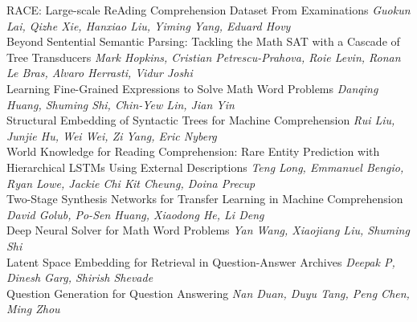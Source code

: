 \documentclass{book}
\begin{document}
    \noindent	RACE: Large-scale ReAding Comprehension Dataset From Examinations \newline 
    {\itshape Guokun Lai, Qizhe Xie, Hanxiao Liu, Yiming Yang, Eduard Hovy} \\
    
    \noindent	Beyond Sentential Semantic Parsing: Tackling the Math SAT with a Cascade of Tree Transducers \newline 
    {\itshape Mark Hopkins, Cristian Petrescu-Prahova, Roie Levin, Ronan Le Bras, Alvaro Herrasti, Vidur Joshi} \\
    
    \noindent	Learning Fine-Grained Expressions to Solve Math Word Problems \newline 
    {\itshape Danqing Huang, Shuming Shi, Chin-Yew Lin, Jian Yin} \\
    
    \noindent	Structural Embedding of Syntactic Trees for Machine Comprehension \newline 
    {\itshape Rui Liu, Junjie Hu, Wei Wei, Zi Yang, Eric Nyberg} \\
    
    \noindent	World Knowledge for Reading Comprehension: Rare Entity Prediction with Hierarchical LSTMs Using External Descriptions \newline 
    {\itshape Teng Long, Emmanuel Bengio, Ryan Lowe, Jackie Chi Kit Cheung, Doina Precup} \\
    
    \noindent	Two-Stage Synthesis Networks for Transfer Learning in Machine Comprehension \newline 
    {\itshape David Golub, Po-Sen Huang, Xiaodong He, Li Deng} \\
    
    \noindent	Deep Neural Solver for Math Word Problems \newline 
    {\itshape Yan Wang, Xiaojiang Liu, Shuming Shi} \\
    
    \noindent	Latent Space Embedding for Retrieval in Question-Answer Archives \newline 
    {\itshape Deepak P, Dinesh Garg, Shirish Shevade} \\
    
    \noindent	Question Generation for Question Answering \newline 
    {\itshape Nan Duan, Duyu Tang, Peng Chen, Ming Zhou} \\
    
\end{document}
